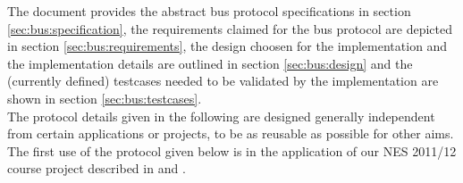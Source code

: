 The document provides the abstract bus protocol specifications 
in section \ref{sec:bus:specification}, the requirements claimed 
for the bus protocol are depicted in section \ref{sec:bus:requirements}, 
the design choosen for the implementation and the 
implementation details are outlined in section \ref{sec:bus:design} 
and the (currently defined) testcases needed to be validated by 
the implementation are shown in section \ref{sec:bus:testcases}.\\

The protocol details given in the following are 
designed generally independent from certain 
applications or projects, to be as reusable 
as possible for other aims. 
The first use of the protocol given below is in the application 
of our NES 2011/12 course project described in \cite[NESD1]{NESD1} and \cite[NESD3]{NESD3}.\\
 